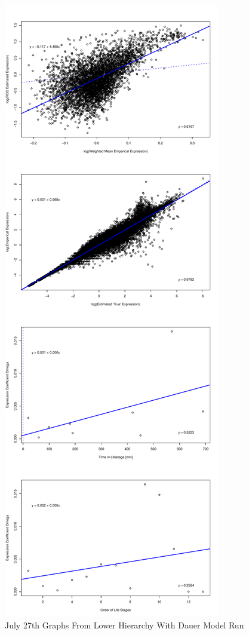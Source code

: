 \documentclass[letterpaper,index=totoc,hyperref,openany]{labbook} %
\begin{document}
\begin{figure}[H]
\begin{center}
\includegraphics[scale=.45]{../Lower_Hierarchy_With_Dauer_1/Plots/lower_hierarchy_with_dauer_original_model_celegans_weighted_expr_vector_beta_noise_fixed_sroc_withIntercept.pdf}
\end{center}
\caption{July 27th Graphs From Lower Hierarchy With Dauer Model Run}
\end{figure}
\end{document}
